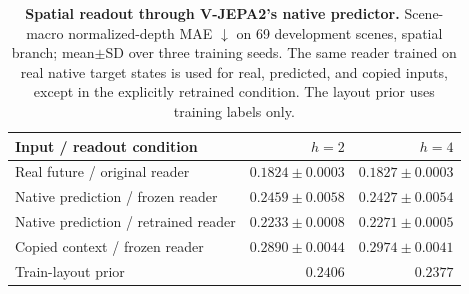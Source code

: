 \documentclass{article} %
\begin{document}
\begin{table}[t]
  \centering
  \caption{\textbf{Spatial readout through V-JEPA2's native predictor.}
  Scene-macro normalized-depth MAE $\downarrow$ on 69 development scenes,
  spatial branch; mean$\pm$SD over three training seeds. The same reader
  trained on real native target states is used for real, predicted, and copied
  inputs, except in the explicitly retrained condition. The layout prior
  uses training labels only.}
  \label{tab:predictive-spatial-interface}
  \small
  \setlength{\tabcolsep}{5pt}
  \begin{tabular}{@{}lrr@{}}
    \toprule
    \rowcolor{morandiheader}
    Input / readout condition & $h=2$ & $h=4$ \\
    \midrule
    Real future / original reader      & $0.1824{\pm}0.0003$ & $0.1827{\pm}0.0003$ \\
    Native prediction / frozen reader  & $0.2459{\pm}0.0058$ & $0.2427{\pm}0.0054$ \\
    Native prediction / retrained reader & $0.2233{\pm}0.0008$ & $0.2271{\pm}0.0005$ \\
    Copied context / frozen reader     & $0.2890{\pm}0.0044$ & $0.2974{\pm}0.0041$ \\
    Train-layout prior                 & $0.2406$ & $0.2377$ \\
    \bottomrule
  \end{tabular}
\end{table}
\end{document}
